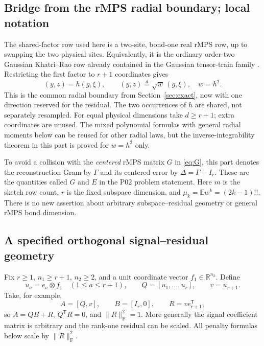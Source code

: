 \documentclass[11pt]{article}
\numberwithin{equation}{section}
\theoremstyle{definition}\newtheorem{definition}[theorem]{Definition}
\theoremstyle{remark}\newtheorem{remark}[theorem]{Remark}
\newcommand{\R}{\mathbb R}\newcommand{\E}{\mathbb E}\newcommand{\Prob}{\mathbb P}
\newcommand{\norm}[1]{\lVert#1\rVert}\newcommand{\ip}[2]{\langle#1,#2\rangle}
\newcommand{\Frob}[1]{\norm{#1}_{\mathrm F}}
\begin{document}
\subsection{Bridge from the rMPS radial boundary; local notation}
The shared-factor row used here is a two-site, bond-one real rMPS row,
up to swapping the two physical sites. Equivalently, it is the ordinary
order-two Gaussian Khatri--Rao row already contained in the Gaussian
tensor-train family \cite{RR2020,CEMT}. Restricting the first factor to
$r+1$ coordinates gives
\[
 (y,z)=h(g,\xi),\qquad (y,z)\stackrel d=\sqrt w\,(g,\xi),\quad w=h^2.
\]
This is the common radial boundary from Section~\ref{sec:exact}, now with
one direction reserved for the residual. The two occurrences of $h$ are
shared, not separately resampled. For equal physical dimensions take
$d\ge r+1$; extra coordinates are unused. The mixed polynomial formulas with
general radial moments below can be reused for other radial laws, but the
inverse-integrability theorem in this part is proved for $w=h^2$ only.

To avoid a collision with the \emph{centered} rMPS matrix $G$ in
\eqref{eq:G}, this part denotes the reconstruction Gram by $\Gamma$ and its
centered error by $\Delta=\Gamma-I_r$. These are the quantities called
$G$ and $E$ in the P02 problem statement. Here $m$ is the sketch row count,
$r$ is the fixed subspace dimension, and $\mu_k=\E w^k=(2k-1)!!$.
There is no new assertion about arbitrary subspace--residual geometry or
general rMPS bond dimension.

\subsection{A specified orthogonal signal--residual geometry}

Fix \(r\ge1\), \(n_1\ge r+1\), \(n_2\ge2\), and a unit coordinate vector \(f_1\in\R^{n_2}\). Define
\[
 u_a=e_a\otimes f_1\quad(1\le a\le r+1),\qquad
 Q=[u_1,\ldots,u_r],\qquad v=u_{r+1}.
\]
Take, for example,
\[
 A=[Q,v],\qquad B=[I_r,0],\qquad R=v e_{r+1}^{\mathsf T},
\]
so \(A=QB+R\), \(Q^{\mathsf T}R=0\), and \(\Frob R^2=1\). More generally the signal coefficient matrix is arbitrary and the rank-one residual can be scaled. All penalty formulas below scale by \(\Frob R^2\).
\end{document}
